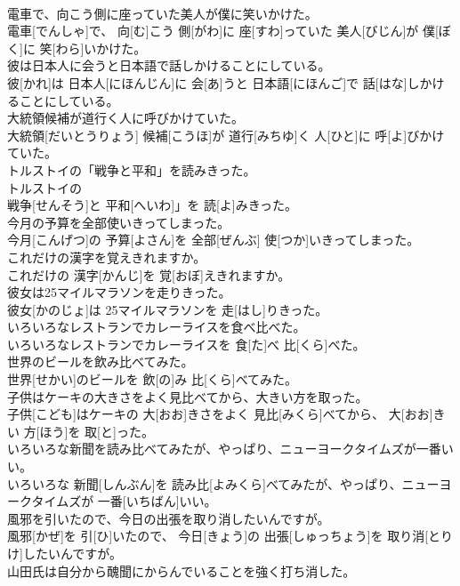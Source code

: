 \documentclass[8pt]{extreport}
\begin{document}
\begin{CJK}{UTF8}{min}
\\	電車で、向こう側に座っていた美人が僕に笑いかけた。	
\\	電車[でんしゃ]で、 向[む]こう 側[がわ]に 座[すわ]っていた 美人[びじん]が 僕[ぼく]に 笑[わら]いかけた。
\\	彼は日本人に会うと日本語で話しかけることにしている。	
\\	彼[かれ]は 日本人[にほんじん]に 会[あ]うと 日本語[にほんご]で 話[はな]しかけることにしている。
\\	大統領候補が道行く人に呼びかけていた。	
\\	大統領[だいとうりょう] 候補[こうほ]が 道行[みちゆ]く 人[ひと]に 呼[よ]びかけていた。
\\	トルストイの「戦争と平和」を読みきった。	
\\	トルストイの
\\	戦争[せんそう]と 平和[へいわ]」を 読[よ]みきった。
\\	今月の予算を全部使いきってしまった。	
\\	今月[こんげつ]の 予算[よさん]を 全部[ぜんぶ] 使[つか]いきってしまった。
\\	これだけの漢字を覚えきれますか。	
\\	これだけの 漢字[かんじ]を 覚[おぼ]えきれますか。
\\	彼女は25マイルマラソンを走りきった。	
\\	彼女[かのじょ]は 25マイルマラソンを 走[はし]りきった。
\\	いろいろなレストランでカレーライスを食べ比べた。	
\\	いろいろなレストランでカレーライスを 食[た]べ 比[くら]べた。
\\	世界のビールを飲み比べてみた。	
\\	世界[せかい]のビールを 飲[の]み 比[くら]べてみた。
\\	子供はケーキの大きさをよく見比べてから、大きい方を取った。	
\\	子供[こども]はケーキの 大[おお]きさをよく 見比[みくら]べてから、 大[おお]きい 方[ほう]を 取[と]った。
\\	いろいろな新聞を読み比べてみたが、やっぱり、ニューヨークタイムズが一番いい。	
\\	いろいろな 新聞[しんぶん]を 読み比[よみくら]べてみたが、やっぱり、ニューヨークタイムズが 一番[いちばん]いい。
\\	風邪を引いたので、今日の出張を取り消したいんですが。	
\\	風邪[かぜ]を 引[ひ]いたので、 今日[きょう]の 出張[しゅっちょう]を 取り消[とりけ]したいんですが。
\\	山田氏は自分から醜聞にからんでいることを強く打ち消した。	

\end{CJK}
\end{document}
